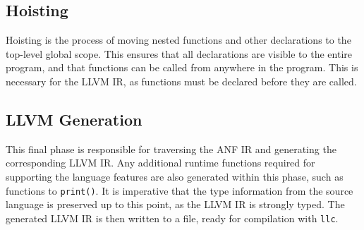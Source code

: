 \subsection{Hoisting}

Hoisting is the process of moving nested functions and other declarations to the top-level global
scope. This ensures that all declarations are visible to the entire program, and that functions can
be called from anywhere in the program. This is necessary for the LLVM IR, as functions must be
declared before they are called.

\subsection{LLVM Generation}

This final phase is responsible for traversing the ANF IR and generating the corresponding LLVM IR.
Any additional runtime functions required for supporting the language features are also generated
within this phase, such as functions to \texttt{print()}. It is imperative that the type information
from the source language is preserved up to this point, as the LLVM IR is strongly typed. The
generated LLVM IR is then written to a file, ready for compilation with \texttt{llc}.
